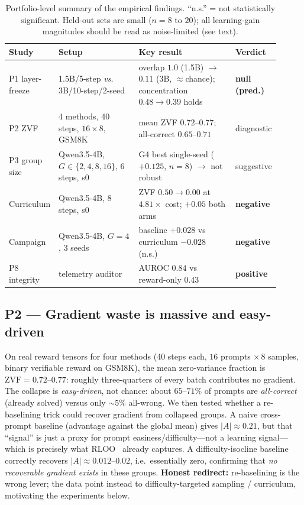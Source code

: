 \documentclass[12pt,a4paper]{report}
\newcommand{\zvf}{\mathrm{ZVF}}
\begin{document}
\begin{table}[t]
\centering
\small
\begin{tabular}{@{}L{0.14\linewidth}L{0.30\linewidth}L{0.37\linewidth}L{0.10\linewidth}@{}}
\toprule
\textbf{Study} & \textbf{Setup} & \textbf{Key result} & \textbf{Verdict} \\
\midrule
P1 layer-freeze
& 1.5B/5-step \emph{vs.} 3B/10-step/2-seed
& overlap $1.0$ (1.5B) $\to$ $0.11$ (3B, ${\approx}$chance); concentration $0.48{\to}0.39$ holds
& \textbf{null (pred.)} \\
P2 ZVF
& 4 methods, 40 steps, $16\times8$, GSM8K
& mean ZVF $0.72$--$0.77$; all-correct $0.65$--$0.71$
& diagnostic \\
P3 group size
& Qwen3.5-4B, $G\in\{2,4,8,16\}$, 6 steps, s0
& G4 best single-seed ($+0.125$, $n{=}8$) $\to$ not robust
& suggestive \\
Curriculum
& Qwen3.5-4B, 8 steps, s0
& ZVF $0.50\to0.00$ at $4.81\times$ cost; $+0.05$ both arms
& \textbf{negative} \\
Campaign
& Qwen3.5-4B, $G{=}4$, 3 seeds
& baseline $+0.028$ vs curriculum $-0.028$ (n.s.)
& \textbf{negative} \\
P8 integrity
& telemetry auditor
& AUROC $0.84$ vs reward-only $0.43$
& \textbf{positive} \\
\bottomrule
\end{tabular}
\caption{Portfolio-level summary of the empirical findings. ``n.s.'' = not
statistically significant. Held-out sets are small ($n=8$ to $20$); all
learning-gain magnitudes should be read as noise-limited (see text).}
\label{tab:summary}
\end{table}

\subsection{P2 --- Gradient waste is massive and easy-driven}
On real reward tensors for four methods (40 steps each, $16$ prompts
$\times\,8$ samples, binary verifiable reward on GSM8K), the mean zero-variance
fraction is $\zvf = 0.72$--$0.77$: roughly three-quarters of every batch
contributes no gradient. The collapse is \emph{easy-driven}, not chance: about
$65$--$71\%$ of prompts are \emph{all-correct} (already solved) versus only
${\sim}5\%$ all-wrong. We then tested whether a re-baselining trick could recover
gradient from collapsed groups. A naive cross-prompt baseline (advantage against
the global mean) gives $|A|\approx0.21$, but that ``signal'' is just a proxy for
prompt easiness/difficulty---not a learning signal---which is precisely what
RLOO~\cite{ahmadian2024rloo} already captures. A difficulty-isocline baseline
correctly recovers $|A|\approx0.012$--$0.02$, i.e.\ essentially zero, confirming
that \emph{no recoverable gradient exists} in these groups. \textbf{Honest
redirect:} re-baselining is the wrong lever; the data point instead to
difficulty-targeted sampling / curriculum, motivating the experiments below.
\end{document}
